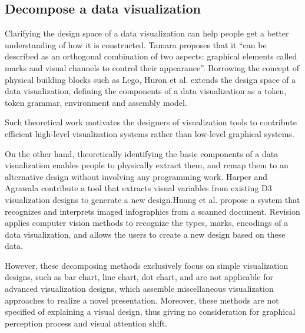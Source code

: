 \subsection{Decompose a data visualization}
Clarifying the design space of a data visualization can help people get a better understanding of how it is constructed. Tamara \cite{munzner_visualization_2014} proposes that it ``can be described as an orthogonal combination of two aspects: graphical elements called marks and visual channels to control their appearance''. Borrowing the concept of physical building blocks such as Lego, Huron et al. \cite{huron_constructive_2014} extends the design space of a data visualization, defining the components of a data visualization as a token, token grammar, environment and assembly model.

Such theoretical work motivates the designers of visualization tools to contribute efficient high-level visualization systems rather than low-level graphical systems\cite{bostock_protovis:_2009,mendez_ivolver:_2016}. 

On the other hand, theoretically identifying the basic components of a data visualization enables people to physically extract them, and remap them to an alternative design without involving any programming work. Harper and Agrawala \cite{harper_deconstructing_2014} contribute a tool that extracts visual variables from existing D3 visualization designs to generate a new design.Huang et al.\cite{Huang:2007:SUI:1284420.1284427} propose a system that recognizes and interprets imaged
infographics from a scanned document. Revision\cite{savva_revision:_2011} applies computer vision methods to recognize the types, marks, encodings of a data visualization, and allows the users to create a new design based on these data. 

However, these decomposing methods exclusively focus on simple visualization designs, such as bar chart, line chart, dot chart, and are not applicable for advanced visualization designs, which assemble miscellaneous visualization approaches to realize a novel presentation. Moreover, these methods are not specified of explaining a visual design, thus giving no consideration for graphical perception process and visual attention shift.


